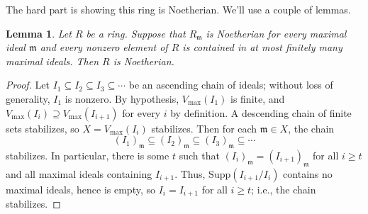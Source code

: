 \documentclass{amsart}[12pt]
\newcommand{\fm}{{\mathfrak m}}
\numberwithin{equation}{section}
\theoremstyle{plain} %
\newtheorem{lem}[equation]{Lemma}
\theoremstyle{definition}
\theoremstyle{remark}
\begin{document}
The hard part is showing this ring is Noetherian. We'll use a couple of lemmas.

\begin{lem} Let $R$ be a ring. Suppose that $R_\fm$ is Noetherian for every maximal ideal $\fm$ and every nonzero element of $R$ is contained in at most finitely many maximal ideals. Then $R$ is Noetherian.
\end{lem}
\begin{proof}
Let $I_1\subseteq I_2 \subseteq I_3 \subseteq \cdots$ be an ascending chain of ideals; without loss of generality, $I_1$ is nonzero. By hypothesis, $V_{\max}(I_1)$ is finite, and $V_{\max}(I_i) \supseteq V_{\max}(I_{i+1})$ for every $i$ by definition. A descending chain of finite sets stabilizes, so $X=V_{\max}(I_i)$ stabilizes.  Then for each $\fm\in X$, the chain 
\[(I_1)_{\fm} \subseteq (I_2)_{\fm} \subseteq (I_3)_{\fm} \subseteq \cdots\]
stabilizes. In particular, there is some $t$ such that $(I_i)_{\fm} = (I_{i+1})_{\fm}$ for all $i\geq t$ and all maximal ideals containing $I_{i+1}$. Thus, $\mathrm{Supp}(I_{i+1}/I_i)$ contains no maximal ideals, hence is empty, so $I_i=I_{i+1}$ for all $i\geq t$; i.e., the chain stabilizes.
\end{proof}
\end{document}
